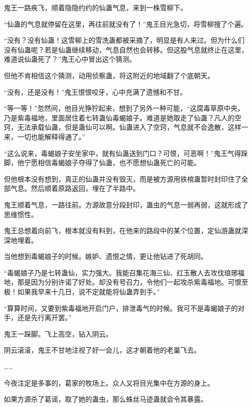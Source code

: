
\begin{this_body}

鬼王一路疾飞，顺着隐隐约约的仙蛊气息，来到一株雪柳下。

“仙蛊的气息就停留在这里，再往前就没有了！”鬼王目光急切，将雪柳搜了个遍。

“没有？没有仙蛊！这雪柳上的雪洗蛊都被采摘了，明显是有人来过。但为什么们没有仙蛊呢？若是仙蛊继续移动，气息自然也会转移。但这股气息就终止在这里，难道说仙蛊死了？”鬼王心中冒出这个猜测。

但他不肯相信这个猜测，动用侦察蛊，将这附近的地域翻了个底朝天。

“没有，还是没有！”鬼王恨恨咬牙，心中充满了遗憾和不甘。

“等一等！”忽然间，他目光狰狞起来，想到了另外一种可能，“这腐毒草原中央，乃是紫毒福地，里面居住着七转蛊仙毒蝎娘子。难道是她取走了仙蛊？凡人的空窍，无法承载仙蛊，但是蛊仙可以啊。仙蛊进入了空窍，气息就不会逸散，这样一来，一切也能解释得通了。”

“这么说来，毒蝎娘子安坐家中，就有仙蛊送到门口？可恨，可恶啊！”鬼王气得跺脚，他宁愿相信毒蝎娘子夺得了仙蛊，也不愿想仙蛊死亡的可能。

但他根本没有想到，真正的仙蛊并没有毁灭，而是被方源用铁棺蛊暂时封印住了全部气息。然后顺着原路返回，埋在了半路中。

鬼王顺着气息，一路往前。方源故意分段封印，蛊虫的气息一弱再弱，这就形成了思维惯性。

鬼王总想着向前飞，根本就没有料到，在他来的路段中的某个位置，定仙游蛊就深深地埋着。

当他想到毒蝎娘子的时候。嫉妒、遗恨之情，更让他钻进了死胡同。

“毒蝎娘子乃是七转蛊仙，实力强大。我能召集花海三仙、红玉散人去攻伐琅琊福地，那是因为分别许诺了好处。却没有号召力，令他们一起攻杀紫毒福地。可恨至极！如果我早来十几日，说不定就能将仙蛊弄到手。”

“算算时间，又要到紫毒福地开启门户，排泄毒气的时候。我可不是毒蝎娘子的对手，还是先行离开罢。”

鬼王一跺脚。飞上高空，钻入阴云。

阴云滚滚，鬼王不甘地注视了好一会儿，这才朝着他的老巢飞去。

……

今夜注定是多事的，葛家的牧场上。众人又将目光集中在方源的身上。

如果方源杀了葛谣，取了她的蛊虫，那么蛛丝马迹蛊就会令其暴露。


\end{this_body}
